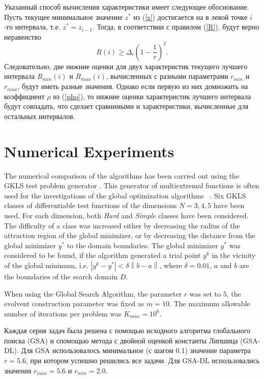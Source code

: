 \documentclass[runningheads]{llncs}
\begin{document}
Указанный способ вычисления характеристики имеет следующее обоснование. 
Пусть текущее минимальное значение $z^*$ из (\ref{z}) достигается на в левой точке $i$-го интервала, т.е. $z^* = z_{i-1}$. Тогда, в соответствии с правилом (\ref{R}), будут верно неравенство
\[
R(i) \geq \Delta_i \left( 1 - \frac{1}{r} \right)^2.
\]
Следовательно, две нижние оценки для двух характеристик текущего лучшего интервала $R_{min}(i)$ и $R_{max}(i)$, вычисленных с разными параметрами $r_{min}$ и $r_{max}$, будут иметь разные значения.
Однако если первую из них домножить на коэффициент $\rho$ из (\ref{pho}), то нижние оценки характеристик лучшего интервала будут совпадать, что сделает сравнимыми и характеристики, вычисленные для остальных интервалов.

\section{Numerical Experiments}

The numerical comparison of the algorithms has been carried out using the GKLS 
test problem generator \cite{Gaviano2003}. 
This generator of multiextremal functions is often used for the investigations of the global 
optimization algorithms ~\cite{Paulavicius2014,Sergeyev2015,%
Barkalov2018}.
Six GKLS classes of differentiable test functions of the dimensions $N = 3,4,5$
have been used. For each dimension, both \textit{Hard} and \textit{Simple}
classes have been considered. The difficulty of a class was increased either by
decreasing the radius of the attraction region of the global minimizer, or by
decreasing the distance from the global minimizer $y^\ast$ to the domain
boundaries. The global minimizer $y^\ast$ was considered to be found, if the
algorithm generated a trial point $y^k$ in the vicinity of the global minimum,
i.e. $\left|y^k-y^\ast\right| <\delta\left\|b-a\right\|$, where $\delta = 0.01$,
$a$ and $b$ are the boundaries of the search domain $D$. 

When using the Global Search Algorithm, the parameter $r$ was set to $5$, 
the evolvent construction parameter was fixed as $m = 10$. 
The maximum allowable number of iterations per problem was $K_{max} = 10^6$.

Каждая серия задач была решена с помощью исходного алгоритма глобального поиска (GSA) и спомощью метода с двойной оценкой константы Липшица (GSA-DL).  Для GSA использовалось минимальное (с шагом 0.1) значение параметра $r = 5.6$, при котором успешно решились все задачи.
Для GSA-DL использовались значения $r_{max} = 5.6$ и $r_{min} = 2.0$. 
\end{document}
